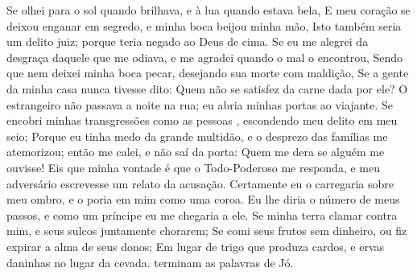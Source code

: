 {  Se olhei para o sol quando brilhava, e à lua quando estava bela,
  E meu coração se deixou enganar em segredo, e minha boca beijou minha mão,
  Isto também seria um delito
{} juiz; porque teria negado ao Deus de cima.
  Se eu me alegrei da desgraça daquele que me odiava, e me agradei quando o mal o encontrou,
  Sendo que nem deixei minha boca pecar, desejando sua morte com maldição,
  Se a gente da minha casa nunca tivesse dito: Quem não se satisfez da carne dada por ele?
  O estrangeiro não passava a noite na rua; eu abria minhas portas ao viajante.
  Se encobri minhas transgressões como as pessoas
{}, 
 escondendo meu delito em meu seio;
  Porque eu tinha medo da grande multidão, e o desprezo das famílias me atemorizou; então me calei, e não saí da porta:
  Quem me dera se alguém me ouvisse! Eis que minha vontade é que o Todo-Poderoso me responda, e meu adversário escrevesse um relato da acusação.
  Certamente eu o carregaria sobre meu ombro, e o poria em mim como uma coroa.
  Eu lhe diria o número de meus passos, e como um príncipe eu me chegaria a ele.
  Se minha terra clamar contra mim, e seus sulcos juntamente chorarem;
  Se comi seus frutos sem
{} dinheiro, ou fiz expirar a alma de seus donos;
  Em lugar de trigo que
{} produza cardos, e ervas daninhas no lugar da cevada.
{} terminam as palavras de Jó.
\par }

